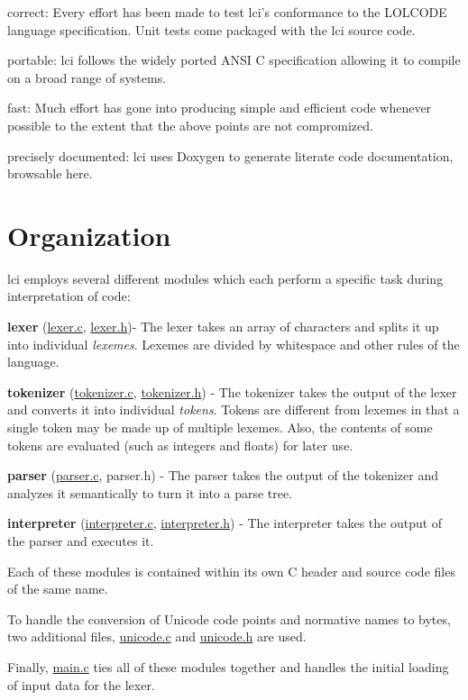 \begin{DoxyItemize}
\item correct\-: Every effort has been made to test lci's conformance to the L\-O\-L\-C\-O\-D\-E language specification. Unit tests come packaged with the lci source code.
\begin{DoxyItemize}
\item portable\-: lci follows the widely ported A\-N\-S\-I C specification allowing it to compile on a broad range of systems.
\item fast\-: Much effort has gone into producing simple and efficient code whenever possible to the extent that the above points are not compromized.
\item precisely documented\-: lci uses Doxygen to generate literate code documentation, browsable here.
\end{DoxyItemize}
\end{DoxyItemize}\hypertarget{index_organization}{}\section{Organization}\label{index_organization}
lci employs several different modules which each perform a specific task during interpretation of code\-:


\begin{DoxyItemize}
\item {\bfseries lexer} (\hyperlink{lexer_8c_source}{lexer.\-c}, \hyperlink{lexer_8h}{lexer.\-h})-\/ The lexer takes an array of characters and splits it up into individual {\itshape lexemes\/}. Lexemes are divided by whitespace and other rules of the language.
\begin{DoxyItemize}
\item {\bfseries tokenizer} (\hyperlink{tokenizer_8c_source}{tokenizer.\-c}, \hyperlink{tokenizer_8h}{tokenizer.\-h}) -\/ The tokenizer takes the output of the lexer and converts it into individual {\itshape tokens\/}. Tokens are different from lexemes in that a single token may be made up of multiple lexemes. Also, the contents of some tokens are evaluated (such as integers and floats) for later use.
\item {\bfseries parser} (\hyperlink{parser_8c_source}{parser.\-c}, parser.\-h) -\/ The parser takes the output of the tokenizer and analyzes it semantically to turn it into a parse tree.
\item {\bfseries interpreter} (\hyperlink{interpreter_8c_source}{interpreter.\-c}, \hyperlink{interpreter_8h}{interpreter.\-h}) -\/ The interpreter takes the output of the parser and executes it.
\end{DoxyItemize}
\end{DoxyItemize}

Each of these modules is contained within its own C header and source code files of the same name.

To handle the conversion of Unicode code points and normative names to bytes, two additional files, \hyperlink{unicode_8c_source}{unicode.\-c} and \hyperlink{unicode_8h}{unicode.\-h} are used.

Finally, \hyperlink{main_8c_source}{main.\-c} ties all of these modules together and handles the initial loading of input data for the lexer. 